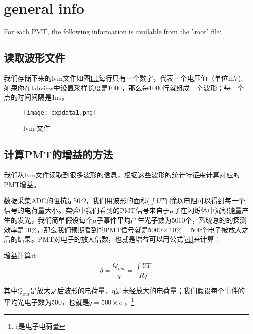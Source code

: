 \documentclass{elegantbook}
\author{ 物理楼\&220 }
\date{\today}
\begin{document}
\maketitle
\tableofcontents
\chapter{general info }
For each PMT, the following information is available from the '.root' file:
\begin{enumerate}
\end{enumerate}

\section{读取波形文件}
我们存储下来的lvm文件如图\ref{fig:g}每行只有一个数字，代表一个电压值（单位mV);如果你在labview中设置采样长度是1000，那么每1000行就组成一个波形；每一个点的时间间隔是1ns。
\begin{figure}[!htbp]
	\centering
	\texttt{[image: expdata1.png]}
	\caption{lvm 文件\label{fig:g}}
\end{figure}


\section{计算PMT的增益的方法}
我们从lvm文件读取到很多波形的信息，根据这些波形的统计特征来计算对应的PMT增益。

数据采集ADC的阻抗是50$\Omega$，我们用波形的面积($\int UT$) 除以电阻可以得到每一个信号的电荷量大小。实验中我们看到的PMT信号来自于$\mu$子在闪烁体中沉积能量产生的发光，我们简单假设每个$\mu$子事件平均产生光子数为5000个，系统总的的探测效率是10\%，那么我们预期看到的PMT信号就是$5000\times 10\%=500$个电子被放大之后的结果。PMT对电子的放大倍数，也就是增益可以用公式\ref{e1}来计算：
\begin{definition}{增益计算}{it}
\begin{equation}
   \label{e1}
	\delta=\frac{Q_{out}}{q}=\frac{\overline{\int UT}}{Rq}.
\end{equation}
\end{definition}
其中$Q_{out}$是放大之后波形的电荷量，q是未经放大的电荷量；我们假设每个事件的平均光电子数为500，也就是$q=500\times e$ 。\footnote{e是电子电荷量}
\end{document}
